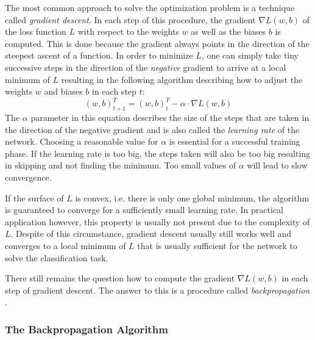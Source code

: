 The most common approach to solve the optimization problem is a
technique called \textit{gradient descent}. In each step of this
procedure, the gradient \(\nabla L(w, b)\) of the loss function \(L\)
with respect to the weights \(w\) as well as the biases \(b\) is
computed. This is done because the gradient always points in the
direction of the steepest ascent of a function. In order to
minimize \(L\), one can simply take tiny successive steps in the
direction of the \textit{negative} gradient to arrive at a local
minimum of \(L\) resulting in the following
algorithm describing how to adjust the weights \(w\) and biases \(b\)
in each step \(t\):
\begin{equation}
  (w, b)^T_{t+1} = (w, b)^T_t - \alpha \cdot \nabla L(w, b)
\end{equation}
The \(\alpha\) parameter in this equation describes the size of the
steps that are taken in the direction of the negative gradient and
is also called the \textit{learning rate} of the network. Choosing a
reasonable value for \(\alpha\) is essential for a successful training
phase. If the learning rate is too big, the steps taken will also be
too big resulting in skipping and not finding the minimum. Too small
values of \(\alpha\) will lead to slow convergence.

If the surface of \(L\) is convex, i.e. there is only one global
minimum, the algorithm is
guaranteed to converge for a sufficiently small learning rate. In
practical application however, this property
is usually not present due to the complexity of \(L\). Despite of this
circumstance, gradient descent usually still works well and converges
to a local minimum of \(L\) that is usually sufficient for the network
to solve the classification task.

There still remains the question how to compute the
gradient \(\nabla L(w, b)\) in each step of gradient descent. The
answer to this is a procedure called \textit{backpropagation} \cite{Rumelhart}.

\subsubsection{The Backpropagation Algorithm}
\label{sec:backpropagation}

